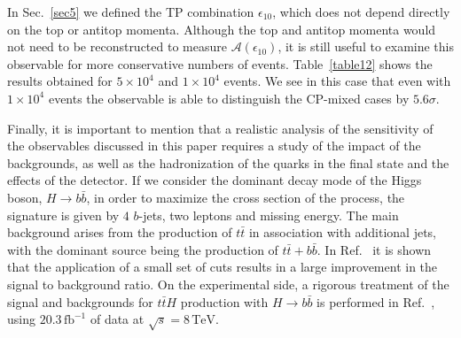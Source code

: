 \documentclass[aps,preprint,tightenlines,floatfix,superscriptaddress,nofootinbib,showpacs]{revtex4-1}
\def\tbar{\bar{t}}
\def\bbar{\bar{b}}
\begin{document}
In Sec.~\ref{sec5} we defined the TP combination $\epsilon_{10}$,
which does not depend directly on the top or antitop momenta.
Although the top and antitop momenta would not need to be
reconstructed to measure $\mathcal{A}(\epsilon_{10})$,
it is still useful to examine this observable for more
conservative numbers of events. Table~\ref{table12} shows the
results obtained for 
$5\times 10^4$ and $1\times 10^4$ events. We see in this case
that even with $1\times 10^4$ events the observable is
able to distinguish the $\mathrm{CP}$-mixed cases by
$5.6\sigma$.

Finally, it is important to mention that a realistic
analysis of the sensitivity of the observables discussed in this
paper requires a study of the impact of the backgrounds, as well as
the hadronization of the quarks in the final state and the effects of
the detector. If we consider the dominant decay mode of the Higgs boson,
$H\rightarrow b\bbar$, in order to maximize the cross section of the
process, the signature is given by $4$ $b$-jets, two leptons and
missing energy.  The main background arises from the production of
$t\tbar$ in association with additional jets, with the dominant
source being the production of $t\tbar + b\bbar$.
In Ref.~\cite{chinos} it is shown that the application of a small
set of cuts results in a large improvement in the signal to background
ratio.  
On the experimental side, a
rigorous treatment of the signal and backgrounds
for $t\tbar H$ production with $H\to b\bbar$ 
is performed in Ref.~\cite{atlasger}, using $20.3\,
\mathrm{fb}^{-1}$ of data at $\sqrt{s}=8\,\mathrm{TeV}$.
      
\end{document}
